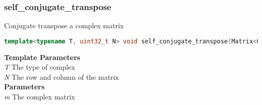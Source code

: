 \subsubsection{self\_conjugate\_transpose}
\begin{mdframed}
Conjugate transpose a complex matrix
\begin{lstlisting}[language=C++]
template<typename T, uint32_t N> void self_conjugate_transpose(Matrix<Complex<T>, N, N>& m) 
\end{lstlisting}
\textbf{Template Parameters} \\ 
\textit{T} The type of complex \\ 
\textit{N} The row and column of the matrix \\ 
\textbf{Parameters} \\ 
\textit{m} The complex matrix \\ 
\end{mdframed}


